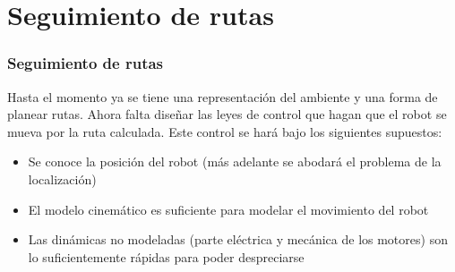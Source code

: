 \documentclass[10pt,spanish,aspectratio=1610]{beamer}
\begin{document}
\section{Seguimiento de rutas}
\begin{frame}\frametitle{Seguimiento de rutas}
  Hasta el momento ya se tiene una representación del ambiente y una forma de planear rutas. Ahora falta diseñar las leyes de control que hagan que el robot se mueva por la ruta calculada. Este control se hará bajo los siguientes supuestos:
  \begin{itemize}
  \item Se conoce la posición del robot (más adelante se abodará el problema de la localización)
  \item El modelo cinemático es suficiente para modelar el movimiento del robot 
  \item Las dinámicas no modeladas (parte eléctrica y mecánica de los motores) son lo suficientemente rápidas para poder despreciarse
  \end{itemize}
\end{frame}
\end{document}
